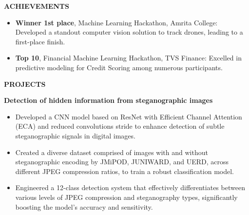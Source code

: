 \documentclass[10pt,a4]{article}
\begin{document}
{\begin{flushleft}
\begin{itemize}
        \end{itemize}

\end{flushleft}


\begin{flushleft}
        {\Large \textbf{ACHIEVEMENTS}}
        \vspace{1.5mm}
        \begin{itemize}
        \item \large \textbf{Winner 1st place}, Machine Learning Hackathon, Amrita College: Developed a standout computer vision
        solution to track drones, leading to a first-place finish.
        \item \large \textbf{Top 10}, Financial Machine Learning Hackathon, TVS Finance: Excelled in predictive modeling for Credit Scoring among numerous participants.
        \end{itemize}
\end{flushleft}

\begin{flushleft}
    {\Large \textbf{PROJECTS}}
    \vspace{1.5mm}
    \item \textbf{\large Detection of hidden information from steganographic images}
        \begin{itemize}
            \item \large Developed a CNN model based on ResNet with Efficient Channel Attention (ECA) and reduced convolutions stride to enhance detection of subtle steganographic signals in digital images.
            \item \large Created a diverse dataset comprised of images with and without steganographic encoding by JMiPOD, JUNIWARD, and UERD, across different JPEG compression ratios, to train a robust classification model.
            \item \large Engineered a 12-class detection system that effectively differentiates between various levels of JPEG compression and steganography types, significantly boosting the model’s accuracy and sensitivity.
        \end{itemize}

\end{flushleft}

}
	
\end{document}
